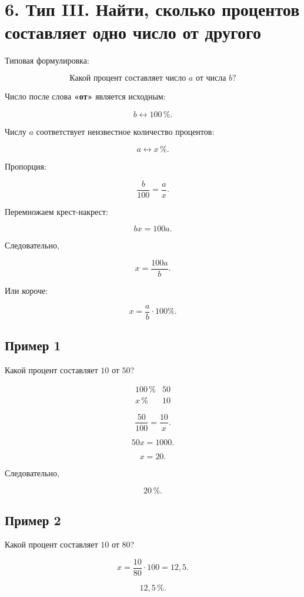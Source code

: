 \documentclass[a4paper,12pt]{article}
\newcommand{\pct}[1]{#1\,\%}
\begin{document}
\section*{\textcolor{darkaccent}{6. Тип III. Найти, сколько процентов составляет одно число от другого}}

Типовая формулировка:

\[
\boxed{
\text{Какой процент составляет число }a\text{ от числа }b?
}
\]

Число после слова \textbf{«от»} является исходным:

\[
b \longleftrightarrow \pct{100}.
\]

Числу \(a\) соответствует неизвестное количество процентов:

\[
a \longleftrightarrow x\,\%.
\]

Пропорция:

\[
\frac{b}{100}=\frac{a}{x}.
\]

Перемножаем крест-накрест:

\[
bx=100a.
\]

Следовательно,

\[
\boxed{x=\frac{100a}{b}}.
\]

Или короче:

\[
\boxed{x=\frac{a}{b}\cdot100\%}.
\]

\subsection*{Пример 1}

Какой процент составляет \(10\) от \(50\)?

\[
\begin{array}{c|c}
\pct{100} & 50\\
x\,\% & 10
\end{array}
\]

\[
\frac{50}{100}=\frac{10}{x}.
\]

\[
50x=1000.
\]

\[
x=20.
\]

Следовательно,

\[
\boxed{\pct{20}}.
\]

\subsection*{Пример 2}

Какой процент составляет \(10\) от \(80\)?

\[
x=\frac{10}{80}\cdot100=12{,}5.
\]

\[
\boxed{\pct{12,5}}.
\]
\end{document}
